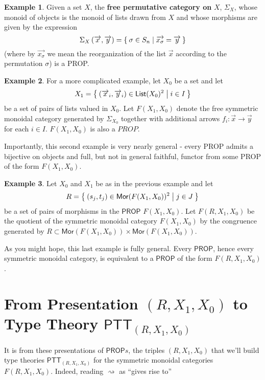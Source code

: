 \documentclass[pra,floatfix,
amsmath,superscriptaddress, 12pt]{article}
\theoremstyle{definition}
\newtheorem*{example}{Example}
\begin{document}
\begin{example}
Given a set $X$, the \textbf{free permutative category on} $X$, $\Sigma_{X}$, whose monoid of objects is the monoid of lists drawn from $X$ and whose morphisms are given by the expression
\[
    \Sigma_{X}\left(\overrightarrow{x},\overrightarrow{y}\right)
    =
    \Set{\sigma \in S_{n} | \overrightarrow{x_\sigma}=\overrightarrow{y}}
\]
(where by $\overrightarrow{x_\sigma}$ we mean the reorganization of the list $\overrightarrow{x}$ according to the permutation $\sigma$) is a \textsf{PROP}.
\end{example}

\begin{example}
For a more complicated example, let $X_0$ be a set and let \[X_1=\Set{(\overrightarrow{x}_i,\overrightarrow{y}_i) \in \mathsf{List}(X_0)^2| i \in I}\] be a set of pairs of lists valued in $X_0$. Let $F(X_1,X_0)$ denote the free symmetric monoidal category generated by $\Sigma_{X_0}$ together with additional arrows $f_{i}:\overrightarrow{x} \longrightarrow \overrightarrow{y}$ for each $i\in I$. $F(X_1,X_0)$ is also a $PROP$.
\end{example}

Importantly, this second example is very nearly general - every \textsf{PROP} admits a bijective on objects and full, but not in general faithful, functor from some \textsf{PROP} of the form $F(X_1,X_0)$.

\begin{example}
 Let  $X_0$ and $X_1$ be as in the previous example and let
 \[
    R=\Set{ (s_j,t_j) \in \mathsf{Mor}(F(X_1,X_0))^2 | j \in J}
 \]
 be a set of pairs of morphisms in the $\mathsf{PROP}$ $F(X_1,X_0)$. Let $F(R,X_1,X_0)$ be the quotient of the symmetric monoidal category $F(X_1,X_0)$ by the congruence generated by $R \subset \mathsf{Mor}(F(X_1,X_0)) \times \mathsf{Mor}(F(X_1,X_0))$.
\end{example}

As you might hope, this last example is fully general. Every $\mathsf{PROP}$, hence every symmetric monoidal category, is equivalent to a $\mathsf{PROP}$ of the form $F(R,X_1,X_0)$.

\section{From Presentation $(R,X_1,X_0)$ to Type Theory $\mathsf{PTT}_{(R,X_1,X_0)}$}

It is from these presentations of $\mathsf{PROP}s$, the triples $(R,X_1,X_0)$ that we'll build type theories $\mathsf{PTT}_{(R,X_1,X_0)}$ for the symmetric monoidal categories $F(R,X_1,X_0)$. Indeed, reading $\rightsquigarrow$ as ``gives rise to''
\end{document}
